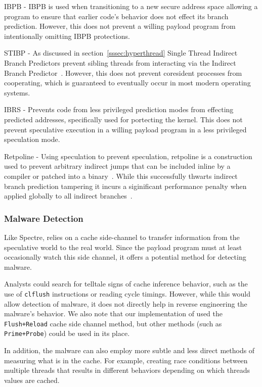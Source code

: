 IBPB - IBPB is used when transitioning to a new secure address space allowing a
program to ensure that earlier code's behavior does not effect its branch prediction.
However, this does not prevent a willing payload program from intentionally omitting
IBPB protections.

STIBP - As discussed in section~\ref{sssec:hyperthread} Single Thread Indirect Branch Predictors
prevent sibling threads from interacting via the Indirect Branch Predictor~\cite{}.
However, this does not prevent coresident processes from cooperating, which is
guaranteed to eventually occur in most modern operating systems.

IBRS - Prevents code from less privileged prediction modes from effecting predicted
addresses, specifically used for portecting the kernel. This does not
prevent speculative execution in a willing payload program in a less privileged
speculation mode.

Retpoline - Using speculation to prevent speculation, retpoline is a construction
used to prevent arbitrary indirect jumps that can be included inline by a compiler
or patched into a binary~\cite{}. While this successfully thwarts indirect branch prediction
tampering it incurs a siginificant performance penalty when applied globally to all
indirect branches~\cite{}.

\subsubsection{Malware Detection}
\label{subsubsec:malware}
Like Spectre, \speculake relies on a cache side-channel to transfer
information from the speculative world to the real world. Since the payload
program must at least occasionally watch this side channel, it offers a
potential method for detecting \speculake malware.

Analysts could search for telltale signs of cache inference behavior, such as
the use of \texttt{clflush} instructions or reading cycle timings. However,
while this would allow detection of \speculake malware, it does not directly
help in reverse engineering the malware's behavior. We also note that our
implementation of \speculake used the \texttt{Flush+Reload} cache side channel
method, but other methods (such as \texttt{Prime+Probe}) could be used in its
place.

In addition, the malware can also employ more subtle and less direct methods
of measuring what is in the cache. For example, creating race conditions between
multiple threads that results in different behaviors depending on which threads
values are cached.


